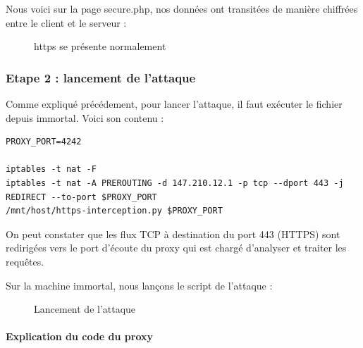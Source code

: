 Nous voici sur la page secure.php, nos données ont transitées de manière chiffrées entre le client et le serveur :

\begin{figure}[H]
  \caption{https se présente normalement}
\end{figure}


\subsubsection{Etape 2 : lancement de l'attaque}

Comme expliqué précédement, pour lancer l'attaque, il faut exécuter le fichier  depuis immortal. Voici son contenu :

\begin{verbatim}
PROXY_PORT=4242

iptables -t nat -F
iptables -t nat -A PREROUTING -d 147.210.12.1 -p tcp --dport 443 -j REDIRECT --to-port $PROXY_PORT
/mnt/host/https-interception.py $PROXY_PORT
\end{verbatim}

On peut constater que les flux TCP à destination du port 443 (HTTPS) sont redirigées vers le port d'écoute du proxy qui est chargé d'analyser et traiter les requêtes.

Sur la machine immortal, nous lançons le script de l'attaque :

\begin{figure}[H]
  \caption{Lancement de l'attaque}
\end{figure}

\paragraph{Explication du code du proxy \\}

